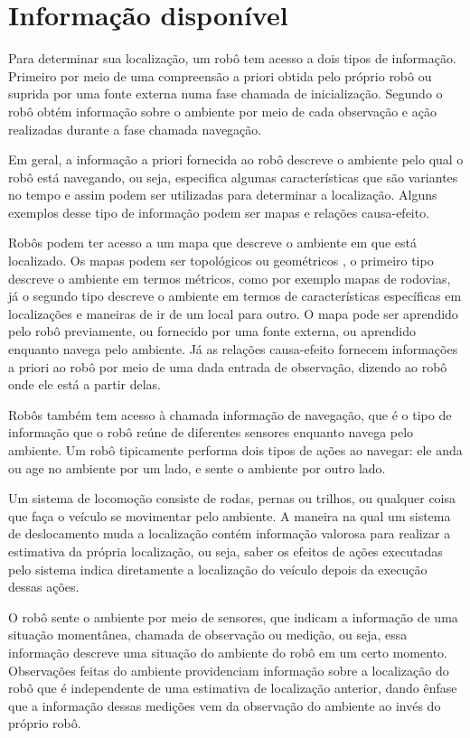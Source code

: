 \documentclass[acronym, symbols, table]{fei}
\begin{document}
		\section{Informação disponível}
			
			Para determinar sua localização, um robô tem acesso a dois tipos de informação. Primeiro por meio de uma compreensão a priori obtida pelo próprio robô ou suprida por uma fonte externa numa fase chamada de inicialização. Segundo o robô obtém informação sobre o ambiente por meio de cada observação e ação realizadas durante a fase chamada navegação. 
			
			Em geral, a informação a priori fornecida ao robô descreve o ambiente pelo qual o robô está navegando, ou seja, especifica algumas características que são variantes no tempo e assim podem ser utilizadas para determinar a localização. Alguns exemplos desse tipo de informação podem ser mapas e relações causa-efeito.
			
			Robôs podem ter acesso a um mapa que descreve o ambiente em que está localizado. Os mapas podem ser topológicos ou geométricos \cite{mendes2017perceccao}, o primeiro tipo descreve o ambiente em termos métricos, como por exemplo mapas de rodovias, já o segundo tipo descreve o ambiente em termos de características específicas em localizações e maneiras de ir de um local para outro. O mapa pode ser aprendido pelo robô previamente, ou fornecido por uma fonte externa, ou aprendido enquanto navega pelo ambiente. Já as relações causa-efeito fornecem informações a priori ao robô por meio de uma dada entrada de observação, dizendo ao robô onde ele está a partir delas.
			
			Robôs também tem acesso à chamada informação de navegação, que é o tipo de informação que o robô reúne de diferentes sensores enquanto navega pelo ambiente. Um robô tipicamente performa dois tipos de ações ao navegar: ele anda ou age no ambiente por um lado, e sente o ambiente por outro lado.
			
			Um sistema de locomoção consiste de rodas, pernas ou trilhos, ou qualquer coisa que faça o veículo se movimentar pelo ambiente. A maneira na qual um sistema de deslocamento muda a localização contém informação valorosa para realizar a estimativa da própria localização, ou seja, saber os efeitos de ações executadas pelo sistema indica diretamente a localização do veículo depois da execução dessas ações.
			
			O robô sente o ambiente por meio de sensores, que indicam a informação de uma situação momentânea, chamada de observação ou medição, ou seja, essa informação descreve uma situação do ambiente do robô em um certo momento. Observações feitas do ambiente providenciam informação sobre a localização do robô que é independente de uma estimativa de localização anterior, dando ênfase que a informação dessas medições vem da observação do ambiente ao invés do próprio robô.
	
\end{document}
